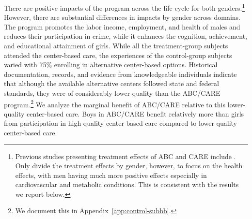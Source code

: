 There are positive impacts of the program across the life cycle for both genders.\footnote{Previous studies presenting treatment effects of ABC and CARE include \citet{Ramey_etal_1985_Project-CARE_TiECSE,Clarke_Campbell_1998_ABC_Comparison_ECRQ,Campbell_Pungello_etal_2001_DP,Campbell_Ramey_etal_2002_ADS,Campbell_Wasik_etal_2008_ECRQ,Campbell_Conti_etal_2014_EarlyChildhoodInvestments}. Only \citet{Campbell_Conti_etal_2014_EarlyChildhoodInvestments} divide the treatment effects by gender, however, to focus on the health effects, with men having much more positive effects especially in cardiovascular and metabolic conditions. This is consistent with the results we report below.} However, there are substantial differences in impacts by gender across domains. The program promotes the labor income, employment, and health of males and reduces their participation in crime, while it enhances the cognition, achievement, and educational attainment of girls. While all the treatment-group subjects attended the center-based care, the experiences of the control-group subjects varied with 75\% enrolling in alternative center-based options. Historical documentation, records, and evidence from knowledgeable individuals indicate that although the available alternative centers followed state and federal standards, they were of considerably lower quality than the ABC/CARE program.\footnote{We document this in Appendix~\ref{app:control-subbb}.} We analyze the marginal benefit of ABC/CARE relative to this lower-quality center-based care. Boys in ABC/CARE benefit relatively more than girls from participation in high-quality center-based care compared to lower-quality center-based care.

